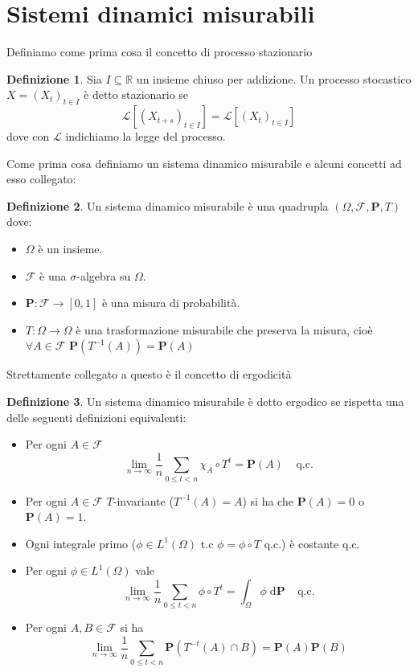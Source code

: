 \documentclass[a4paper,11pt]{book}
\theoremstyle{plain}
\theoremstyle{definition}
\newtheorem{defn}{Definizione}[chapter]
\theoremstyle{remark}
\newcommand{\R}{\mathbb{R}}
\newcommand{\F}{\mathcal{F}}
\newcommand{\Pro}{\mathbf{P}}
\begin{document}
\section{Sistemi dinamici misurabili}
Definiamo come prima cosa il concetto di processo stazionario
\begin{defn}
	Sia $I\subseteq \R$ un insieme chiuso per addizione. Un processo stocastico $X=(X_t)_{t\in I}$ è detto stazionario se 
	\begin{equation*}
		\mathcal{L}[(X_{t+s})_{t\in I} ]= \mathcal{L}[(X_t)_{t\in I}]
	\end{equation*}
	dove con $\mathcal{L}$ indichiamo la legge del processo.
\end{defn}
Come prima cosa definiamo un sistema dinamico misurabile e alcuni concetti ad esso collegato:
\begin{defn}
	Un sistema dinamico misurabile è una quadrupla $(\Omega,\F,\Pro,T)$ dove:
	\begin{itemize}
		\item $\Omega$ è un insieme.
		\item $\F$ è una $\sigma$-algebra su $\Omega$.
		\item $\Pro:\F\rightarrow[0,1]$ è una misura di probabilità.
		\item $T:\Omega\rightarrow \Omega$ è una trasformazione misurabile che preserva la misura, cioè $\forall A\in \F$ $ \Pro(T^{-1}(A))=\Pro(A)$
	\end{itemize}
\end{defn}
Strettamente collegato a questo è il concetto di ergodicità
\begin{defn}
	Un sistema dinamico misurabile è detto ergodico se rispetta una delle seguenti definizioni equivalenti:
	\begin{itemize}
		\item Per ogni $A\in \F$
		\begin{equation*}
		\lim\limits_{n\to\infty}\frac{1}{n}\sum_{0\leq t <n}\chi_A\circ T^t= \Pro(A)\;\;\;\; \text{q.c.}
		\end{equation*}
		\item Per ogni $A\in \F$ $T$-invariante ($T^{-1}(A)=A$) si ha che $\Pro(A)=0$ o $\Pro(A)=1$.
		\item Ogni integrale primo ($\phi\in L^1(\Omega)$ t.c $\phi = \phi\circ T$ q.c.) è costante q.c.
		\item Per ogni $\phi\in L^1(\Omega)$ vale
		\begin{equation*}
		\lim\limits_{n\to\infty}\frac{1}{n}\sum_{0\leq t <n}\phi\circ T^t = \int_\Omega{\phi\;\text{d}\Pro} \;\;\;\; \text{q.c.}
		\end{equation*}
		\item Per ogni $A,B\in\F$ si ha
		\begin{equation*}
		\lim\limits_{n\to\infty}\frac{1}{n}\sum_{0\leq t <n}\Pro(T^{-t}(A)\cap B) = \Pro(A)\Pro(B)
		\end{equation*}
	\end{itemize}
\end{defn}
\end{document}
